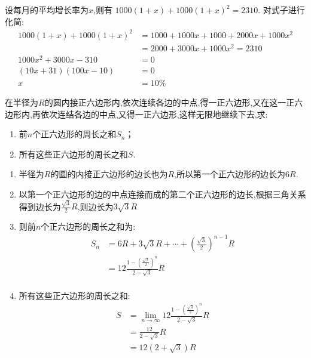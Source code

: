 \documentclass[answers]{exam}
\begin{document}
\begin{questions}
\begin{enumerate}[label=(\arabic*)]
		      \begin{solution}
			      设每月的平均增长率为$x$,则有 	\( 1000(1+x) + 1000(1+x)^2 = 2310 \).
			      对式子进行化简:
			      \begin{align*}
				      1000(1+x) + 1000(1+x)^2 & = 1000 + 1000x + 1000 + 2000x + 1000x^2 \\
				                              & = 2000 + 3000x + 1000x^2 = 2310         \\
				      1000x^2 +3000x - 310    & = 0                                     \\
				      (10x + 31)(100x - 10)   & = 0                                     \\
				      x                       & = 10\%
			      \end{align*}
		      \end{solution}
	\end{enumerate}
	\question 在半径为$R$的圆内接正六边形内,依次连续各边的中点,得一正六边形,又在这一正六边形内,再依次连结各边的中点,又得一正六边形,这样无限地继续下去,求:
	\begin{enumerate}[label=(\arabic*)]
		\item 前$n$个正六边形的周长之和$S_n$；
		\item 所有这些正六边形的周长之和$S$.
	\end{enumerate}
	\begin{solution}
		\begin{enumerate}[label=\zhnum{*}、]
			\item 半径为$R$的圆的内接正六边形的边长也为$R$,所以第一个正六边形的边长为$6R$.
			\item
			      以第一个正六边形的边的中点连接而成的第二个正六边形的边长,根据三角关系得到边长为$\frac{\sqrt{3}}{2}R$,则边长为$3\sqrt{3}R$
			\item 则前$n$个正六边形的周长之和为:
			      \begin{align*}
				      S_n & = 6R + 3\sqrt{3}R + \cdots +  (\frac{\sqrt{3}}{2})^{n-1}R \\
				          & = 12\frac{1-(\frac{\sqrt{3}}{2})^n}{2-\sqrt{3}}R          \\
			      \end{align*}
			\item 所有这些正六边形的周长之和:
			      \begin{align*}
				      S & = \lim_{n\to\infty}12\frac{1-(\frac{\sqrt{3}}{2})^n}{2-\sqrt{3}}R \\
				        & = \frac{12}{2-\sqrt{3}}R                                          \\
				        & = 12(2+\sqrt{3})R
			      \end{align*}
		\end{enumerate}
	\end{solution}


\end{questions}
\end{document}
